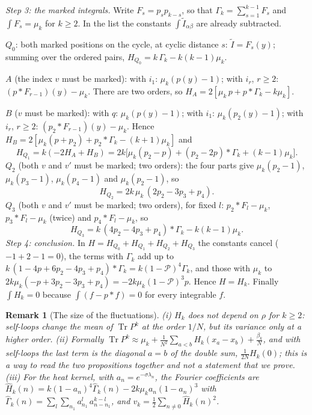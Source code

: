 \documentclass[11pt,a4paper]{article}
\makeatletter
\theoremstyle{stmt}
\theoremstyle{defn}
\theoremstyle{rmk}
\newtheorem{remark}[theorem]{Remark}
\renewenvironment{proof}[1][\proofname]{\par\pushQED{\qed}\normalfont\topsep6\p@\@plus6\p@\relax
  \trivlist\item[\hskip\labelsep{\sffamily\itshape\small #1.}]\ignorespaces}{\popQED\endtrivlist\@endpefalse}
\numberwithin{equation}{section}
\DeclareMathOperator{\Tr}{Tr}
\makeatother
\begin{document}
{\begin{proof}
\emph{Step 3: the marked integrals.} Write $F_s=p_sp_{k-s}$, so that $\Gamma_k=\sum_{s=1}^{k-1}F_s$ and $\int F_s=\mu_k$ for $k\ge2$. In the list the constants $\int\tilde I_{\alpha\beta}$ are already subtracted.

\smallskip\noindent$Q_0$: both marked positions on the cycle, at cyclic distance $s$: $\tilde I=F_s(y)$; summing over the ordered pairs, $H_{Q_0}=k\,\Gamma_k-k(k-1)\mu_k$.

\noindent$A$ (the index $v$ must be marked): with $i_1$: $\mu_k(p(y)-1)$; with $i_r$, $r\ge2$: $(p*F_{r-1})(y)-\mu_k$. There are two orders, so $H_A=2[\mu_k\,p+p*\Gamma_k-k\mu_k]$.

\noindent$B$ ($v$ must be marked): with $q$: $\mu_k(p(y)-1)$; with $i_1$: $\mu_k(p_2(y)-1)$; with $i_r$, $r\ge2$: $(p_2*F_{r-1})(y)-\mu_k$. Hence $H_B=2[\mu_k(p+p_2)+p_2*\Gamma_k-(k+1)\mu_k]$ and
\[
H_{Q_1}=k(-2H_A+H_B)=2k\big[\mu_k(p_2-p)+(p_2-2p)*\Gamma_k+(k-1)\mu_k\big].
\]
\noindent$Q_2$ (both $v$ and $v'$ must be marked; two orders): the four parts give $\mu_k(p_2-1)$, $\mu_k(p_3-1)$, $\mu_k(p_4-1)$ and $\mu_k(p_2-1)$, so
\[
H_{Q_2}=2k\,\mu_k\,(2p_2-3p_3+p_4).
\]
\noindent$Q_3$ (both $v$ and $v'$ must be marked; two orders), for fixed $l$: $p_2*F_l-\mu_k$, $p_3*F_l-\mu_k$ (twice) and $p_4*F_l-\mu_k$, so
\[
H_{Q_3}=k\,(4p_2-4p_3+p_4)*\Gamma_k-k(k-1)\mu_k .
\]
\emph{Step 4: conclusion.} In $H=H_{Q_0}+H_{Q_1}+H_{Q_2}+H_{Q_3}$ the constants cancel ($-1+2-1=0$), the terms with $\Gamma_k$ add up to $k\,(1-4p+6p_2-4p_3+p_4)*\Gamma_k=k(1-\mathcal P)^4\Gamma_k$, and those with $\mu_k$ to $2k\mu_k(-p+3p_2-3p_3+p_4)=-2k\mu_k(1-\mathcal P)^3p$. Hence $H=H_k$. Finally $\int H_k=0$ because $\int(f-p*f)=0$ for every integrable $f$.
\end{proof}

\begin{remark}[The size of the fluctuations]\label{rem:variance}
(i) $H_k$ does not depend on $\rho$ for $k\ge2$: self-loops change the mean of $\Tr P^k$ at the order $1/N$, but its variance only at a higher order. (ii) Formally $\Tr P^k\approx\mu_k+\frac1{N^2}\sum_{a<b}H_k(x_a-x_b)+\frac{\beta_k}N$, and with self-loops the last term is the diagonal $a=b$ of the double sum, $\frac1{2N}H_k(0)$; this is a way to read the two propositions together and not a statement that we prove. (iii) For the heat kernel, with $a_n=e^{-\sigma\lambda_n}$, the Fourier coefficients are $\hat H_k(n)=k(1-a_n)^4\hat\Gamma_k(n)-2k\mu_ka_n(1-a_n)^3$ with $\hat\Gamma_k(n)=\sum_l\sum_{n_1}a_{n_1}^l\,a_{n-n_1}^{k-l}$, and $v_k=\frac12\sum_{n\ne0}\hat H_k(n)^2$.


\end{remark}}
\end{document}
